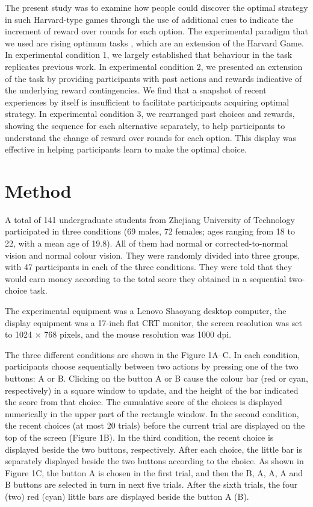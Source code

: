 \documentclass[twocolumn]{article}
\begin{document}
The present study was to examine how people could discover the optimal
strategy in such Harvard-type games through the use of additional cues
to indicate the increment of reward over rounds for each option. The
experimental paradigm that we used are rising optimum tasks
\cite{RN10,RN11,RN2}, which are an extension of the Harvard Game. In
experimental condition 1, we largely established that behaviour in the
task replicates previous work. In experimental condition 2, we
presented an extension of the task by providing participants with past
actions and rewards indicative of the underlying reward
contingencies. We find that a snapshot of recent experiences by itself
\cite{RN2,RN8,RN14,RN17,RN23,RN24,RN25} is insufficient to facilitate
participants acquiring optimal strategy. In experimental condition 3,
we rearranged past choices and rewards, showing the sequence for each
alternative separately, to help participants to understand the change
of reward over rounds for each option. This display was effective in
helping participants learn to make the optimal choice.

\section{Method}

A total of 141 undergraduate students from Zhejiang University of
Technology participated in three conditions (69 males, 72 females;
ages ranging from 18 to 22, with a mean age of 19.8). All of them had
normal or corrected-to-normal vision and normal colour vision. They
were randomly divided into three groups, with 47 participants in each
of the three conditions. They were told that they would earn money
according to the total score they obtained in a sequential two-choice
task.

The experimental equipment was a Lenovo Shaoyang desktop computer, the
display equipment was a 17-inch flat CRT monitor, the screen
resolution was set to 1024 $\times$ 768 pixels, and the mouse
resolution was 1000 dpi.

The three different conditions are shown in the Figure 1A--C. In each
condition, participants choose sequentially between two actions by
pressing one of the two buttons: A or B. Clicking on the button A or B
cause the colour bar (red or cyan, respectively) in a square window to
update, and the height of the bar indicated the score from that
choice. The cumulative score of the choices is displayed numerically
in the upper part of the rectangle window. In the second condition,
the recent choices (at most 20 trials) before the current trial are
displayed on the top of the screen (Figure 1B). In the third
condition, the recent choice is displayed beside the two buttons,
respectively. After each choice, the little bar is separately
displayed beside the two buttons according to the choice. As shown in
Figure 1C, the button A is chosen in the first trial, and then the B,
A, A, A and B buttons are selected in turn in next five trials. After
the sixth trials, the four (two) red (cyan) little bars are displayed
beside the button A (B).
\end{document}
